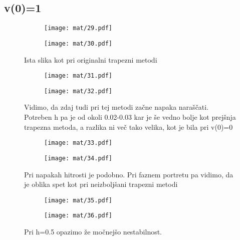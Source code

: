 \documentclass{article}
\begin{document}
\subsection{v(0)=1}

\begin{figure}[H]
\begin{subfigure}{.5\textwidth}
\texttt{[image: mat/29.pdf]}
\end{subfigure}
\begin{subfigure}{.5\textwidth}
\texttt{[image: mat/30.pdf]}
\end{subfigure}
\caption*{Ista slika kot pri originalni trapezni metodi}
\end{figure}

\begin{figure}[H]
\begin{subfigure}{.5\textwidth}
\texttt{[image: mat/31.pdf]}
\end{subfigure}
\begin{subfigure}{.5\textwidth}
\texttt{[image: mat/32.pdf]}
\end{subfigure}
\caption*{Vidimo, da zdaj tudi pri tej metodi začne napaka naraščati. Potreben h pa je od okoli 0.02-0.03 kar je še vedno bolje kot prejšnja trapezna metoda, a razlika ni več tako velika, kot je bila pri v(0)=0}
\end{figure}

\begin{figure}[H]
\begin{subfigure}{.5\textwidth}
\texttt{[image: mat/33.pdf]}
\end{subfigure}
\begin{subfigure}{.5\textwidth}
\texttt{[image: mat/34.pdf]}
\end{subfigure}
\caption*{Pri napakah hitrosti je podobno. Pri faznem portretu pa vidimo, da je oblika spet kot pri neizboljšani trapezni metodi}
\end{figure}

\begin{figure}[H]
\begin{subfigure}{.5\textwidth}
\texttt{[image: mat/35.pdf]}
\end{subfigure}
\begin{subfigure}{.5\textwidth}
\texttt{[image: mat/36.pdf]}
\end{subfigure}
\caption*{Pri h=0.5 opazimo že močnejšo nestabilnost.}
\end{figure}
\end{document}
